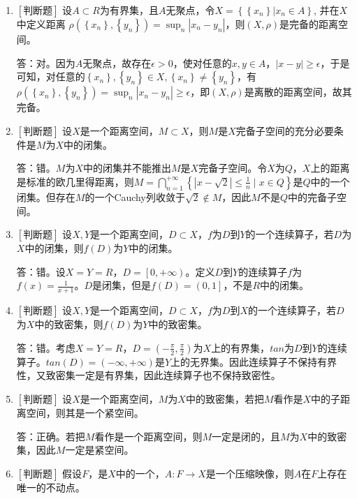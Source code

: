 \documentclass{article}
\begin{document}
\begin{enumerate}
    \item $\left[\textbf{判断题}\right]$ 设$A\subset R$为有界集，且$A$无聚点，令$X=\left\{\left\{x_n\right\}|x_n \in A \right\}$, 并在$X$中定义距离 $\rho\left(\left\{x_n\right\}, \left\{y_n\right\}\right)=\sup _n\left|x_n-y_n\right|$，则$(X, \rho)$是完备的距离空间。

    答：对。因为$A$无聚点，故存在$\epsilon > 0$，使对任意的$x, y \in A$，$\left|x - y\right| \geq \epsilon$，于是可知，对任意的$\left\{x_n\right\}, \left\{y_n\right\} \in X, \left\{x_n\right\} \neq \left\{y_n\right\}$，有$\rho(\left\{x_n\right\}, \left\{y_n\right\})=\sup _n\left|x_n-y_n\right|\geq \epsilon$，即$(X, \rho)$是离散的距离空间，故其完备。

    \item $\left[\textbf{判断题}\right]$ 设$X$是一个距离空间，$M\subset X$，则$M$是$X$完备子空间的充分必要条件是$M$为$X$中的闭集。

    答：错。$M$为$X$中的闭集并不能推出$M$是$X$完备子空间。令$X$为$Q$，$X$上的距离是标准的欧几里得距离，则$M=\bigcap_{n=1}^{+\infty}\left\{\left|x-\sqrt{2}\right| \leq \frac{1}{n} \mid x\in Q \right\}$是$Q$中的一个闭集。但存在$M$的一个Cauchy列收敛于$\sqrt{2} \notin M$，因此$M$不是$Q$中的完备子空间。

    \item $\left[\textbf{判断题}\right]$ 设$X, Y$是一个距离空间，$D\subset X$，$f$为$D$到$Y$的一个连续算子，若$D$为$X$中的闭集，则$f(D)$为$Y$中的闭集。

    答：错。设$X=Y=R$，$D=\left[0, +\infty\right)$。定义$D$到$Y$的连续算子$f$为$f(x)=\frac{1}{x + 1}$。$D$是闭集，但是$f(D)=\left(0,1\right]$，不是$R$中的闭集。
    
    \item $\left[\textbf{判断题}\right]$ 设$X, Y$是一个距离空间，$D\subset X$，$f$为$D$到$X$的一个连续算子，若$D$为$X$中的致密集，则$f(D)$为$Y$中的致密集。

    答：错。考虑$X=Y=R$，$D=(-\frac{\pi}{2}, \frac{\pi}{2})$为$X$上的有界集，$tan$为$D$到$Y$的连续算子。$tan(D)=(-\infty, +\infty)$是$Y$上的无界集。因此连续算子不保持有界性，又致密集一定是有界集，因此连续算子也不保持致密性。

    \item $\left[\textbf{判断题}\right]$ 设$X$是一个距离空间，$M$为$X$中的致密集，若把$M$看作是$X$中的子距离空间，则其是一个紧空间。
    
    答：正确。若把$M$看作是一个距离空间，则$M$一定是闭的，且$M$为$X$中的致密集，因此$M$一定是紧空间。

    \item $\left[\textbf{判断题}\right]$ 假设$F$，是$X$中的一个，$A: F \to X$是一个压缩映像，则$A$在$F$上存在唯一的不动点。


\end{enumerate}
\end{document}
